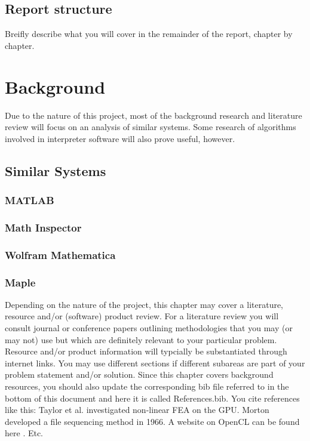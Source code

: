 \documentclass[a4paper, oneside, 11pt]{report}
\begin{document}
\section{Report structure}
Breifly describe what you will cover in the remainder of the report, chapter by chapter.

\chapter{Background}

Due to the nature of this project, most of the background research and literature review will focus on an analysis of similar systems. Some research of algorithms involved in 
interpreter software will also prove useful, however.

\section{Similar Systems}

\subsection{MATLAB\cite{MATLAB}}

\subsection{Math Inspector\cite{Math_Inspector}}

\subsection{Wolfram Mathematica\cite{Mathematica}}

\subsection{Maple\cite{Maple}}

Depending on the nature of the project, this chapter may cover a literature, resource and/or (software) product review. For a literature review you will consult journal or conference papers outlining methodologies that you may (or may not) use but which are definitely relevant to your particular problem. Resource and/or product information will typcially be substantiated through internet links. 
You may use different sections if different subareas are part of your problem statement and/or solution. 
Since this chapter covers background resources, you should also update the corresponding bib file referred to in the bottom of this document and here it is called References.bib.
You cite references like this: Taylor et al. \cite{Taylor:2007} investigated non-linear FEA on the GPU. Morton \cite{Morton:1966} developed a file sequencing method in 1966. A website on OpenCL can be found here \cite{Soos:2012}. Etc.
\end{document}
